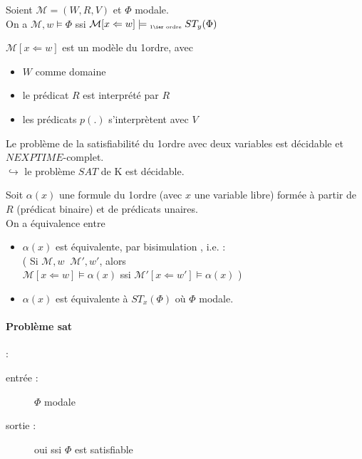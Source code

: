 \documentclass[10pt,a4paper]{article}
\newcommand{\M}{\mathcal{M}}
\DeclareMathOperator{\bisim}{\underline{\leftrightarrow}}
\begin{document}
\begin{prop}
 Soient $ \M = (W,R,V)$ et $ \Phi$ modale. \\
On a $ \M,w \models \Phi$ ssi $ \M [x \Leftarrow w] \models_{\text{ \tiny{1\ier ordre}}} ST_y( \Phi)$
\end{prop}
\begin{rem}
 $\M [x \Leftarrow w]$ est un modèle du 1\ier ordre, avec 
\begin{itemize}
 \item $W$ comme domaine 
 \item le prédicat $R$ est interprété par $R$
 \item les prédicats $p(.)$ s'interprètent avec $V$
\end{itemize}

\end{rem}

\begin{rem}
 Le problème de la satisfiabilité du 1\ier ordre avec deux variables est décidable et $NEXPTIME$-complet.\\
$ \hookrightarrow$ le problème $SAT$ de K est décidable.
\end{rem}

\begin{thm}
 Soit $ \alpha(x)$ une formule du 1\ier ordre (avec $x$ une variable libre) formée à partir de $R$ (prédicat binaire) et de prédicats unaires.\\
On a équivalence entre
\begin{itemize}
 \item $ \alpha(x)$ est équivalente, par bisimulation , i.e. : \\
( Si $ \M,w \bisim \M', w'$, alors \\
$ \M [x \Leftarrow w] \models  \alpha(x)$ ssi $ \M' [x \Leftarrow w'] \models  \alpha(x)$ )
\item $ \alpha(x)$ est équivalente à $ST_x( \Phi)$ où $ \Phi$ modale.
\end{itemize}
\end{thm}

\paragraph{Problème sat}:
\begin{description}
 \item[entrée : ] $ \Phi $ modale
 \item[sortie : ]oui ssi $ \Phi $ est satisfiable
\end{description}
\end{document}
